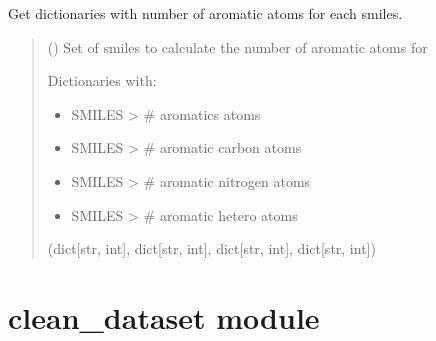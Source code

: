 \documentclass[letterpaper,10pt,english]{sphinxmanual}
\begin{document}
\begin{fulllineitems}
\label{\detokenize{add_rdkit_compound_descriptors:add_rdkit_compound_descriptors.calculate_aromatic_atoms}}
\pysigstartsignatures
{}
\pysigstopsignatures
\sphinxAtStartPar
Get dictionaries with number of aromatic atoms for each smiles.
\begin{quote}\begin{description}
\sphinxAtStartPar
{} (\sphinxstyleliteralemphasis{\sphinxupquote{{[}}}\sphinxstyleliteralemphasis{\sphinxupquote{{]}}}) \textendash{} Set of smiles to calculate the number of aromatic atoms for

\sphinxAtStartPar

\sphinxAtStartPar
Dictionaries with:
\begin{itemize}
\item {} 
\sphinxAtStartPar
SMILES \sphinxhyphen{}\textgreater{} \# aromatics atoms

\item {} 
\sphinxAtStartPar
SMILES \sphinxhyphen{}\textgreater{} \# aromatic carbon atoms

\item {} 
\sphinxAtStartPar
SMILES \sphinxhyphen{}\textgreater{} \# aromatic nitrogen atoms

\item {} 
\sphinxAtStartPar
SMILES \sphinxhyphen{}\textgreater{} \# aromatic hetero atoms

\end{itemize}


\sphinxAtStartPar
(dict{[}str, int{]}, dict{[}str, int{]}, dict{[}str, int{]}, dict{[}str, int{]})

\end{description}\end{quote}

\end{fulllineitems}


\sphinxstepscope


\section{clean\_dataset module}
\label{\detokenize{clean_dataset:module-clean_dataset}}\label{\detokenize{clean_dataset:clean-dataset-module}}\label{\detokenize{clean_dataset::doc}}
\end{document}
